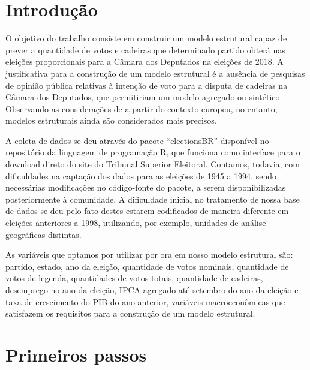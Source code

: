 \documentclass[
	article,			%
	11pt,				%
	oneside,			%
	a4paper,			%
	english,			%
	brazil,				%
	sumario=tradicional
	]{abntex2}
\begin{document}

\frenchspacing 

\maketitle


\textual

\section*{Introdução}

O objetivo do trabalho consiste em construir um modelo estrutural capaz de prever a quantidade de votos e cadeiras que determinado partido obterá nas eleições proporcionais para a Câmara dos Deputados na eleições de 2018. A justificativa para a construção de um modelo estrutural é a ausência de pesquisas de opinião pública relativas à intenção de voto para a disputa de cadeiras na Câmara dos Deputados, que permitiriam um modelo agregado ou sintético. Observando as considerações de  a partir do contexto europeu, no entanto, modelos estruturais ainda são considerados mais precisos.

A coleta de dados se deu através do pacote ``electionsBR'' disponível no repositório da linguagem de programação R, que funciona como interface para o download direto do site do Tribunal Superior Eleitoral. Contamos, todavia, com dificuldades na captação dos dados para as eleições de 1945 a 1994, sendo necessárias modificações no código-fonte do pacote, a serem disponibilizadas posteriormente à comunidade. A dificuldade inicial no tratamento de nossa base de dados se deu pelo fato destes estarem codificados de maneira diferente em eleições anteriores a 1998, utilizando, por exemplo, unidades de análise geográficas distintas.

As variáveis que optamos por utilizar por ora em nosso modelo estrutural são: partido, estado, ano da eleição, quantidade de votos nominais, quantidade de votos de legenda, quantidades de votos totais, quantidade de cadeiras, desemprego no ano da eleição, IPCA agregado até setembro do ano da eleição e taxa de crescimento do PIB do ano anterior, variáveis macroeconômicas que satisfazem os requisitos para a construção de um modelo estrutural.

\section*{Primeiros passos}
\end{document}
